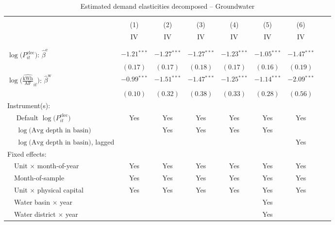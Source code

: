 \begin{table}[t!]\centering
\small
\caption{Estimated demand elasticities decomposed -- Groundwater  \label{tab:water_regs_split}}
\vspace{-0.1cm}
\small
\begin{adjustbox}{center} 
\begin{tabular}{lcccccccc} 
\hline \hline
\vspace{-0.37cm}
\\
 & (1)  & (2)  & (3)  & (4)  & (5)  & (6) \\ 
[0.1em]
 & IV & IV & IV & IV & IV & IV \\
\vspace{-0.37cm}
\\
\cline{2-7}
\vspace{-0.27cm}
\\
 $\log\big(P^{\text{elec}}_{it}\big)$: $\hat\beta^{\text{e}}$ ~ & 
 $-1.21$$^{***}$  & $-1.27$$^{***}$ & $-1.27$$^{***}$ & $-1.23$$^{***}$ & $-1.05$$^{***}$  & $-1.47$$^{***}$ \\ 
& $(0.17)$ & $(0.17)$ & $(0.18)$ & $(0.17)$ & $(0.16)$ & $(0.19)$ \\
[0.75em] 
 $\log\Big(\widehat{\tfrac{{\text{kWh}}}{\text{AF}}}_{it}\Big)$: $\hat\beta^{\text{w}}$ ~ & 
 $-0.99$$^{***}$  & $-1.51$$^{***}$ & $-1.47$$^{***}$ & $-1.25$$^{***}$ & $-1.14$$^{***}$  & $-2.09$$^{***}$ \\ 
[-0.3em] 
& $(0.10)$ & $(0.32)$ & $(0.38)$ & $(0.33)$ & $(0.28)$ & $(0.56)$ \\
[1.5em] 
Instrument(s): \\
[0.1em] 
~~ Default $\log\big(P^{\text{elec}}_{it}\big)$  & Yes & Yes & Yes  & Yes  & Yes & Yes \\
[0.1em] 
~~ $\log\big(\text{Avg depth in basin}\big)$  & & Yes & Yes & Yes & Yes & \\
[0.1em] 
~~ $\log\big(\text{Avg depth in basin}\big)$, lagged  & & & & & & Yes \\
[1.5em] 
Fixed effects: \\
[0.1em] 
~~Unit $\times$ month-of-year  & Yes  & Yes  & Yes  & Yes  & Yes  & Yes   \\ 
[0.1em] 
~~Month-of-sample  & Yes  & Yes  & Yes  & Yes  & Yes  & Yes   \\ 
[0.1em] 
~~Unit $\times$ physical capital & Yes & Yes & Yes & Yes & Yes & Yes  \\
[0.1em] 
~~Water basin $\times$ year & & &  & & Yes &   \\
[0.1em] 
~~Water district $\times$ year & & & & & Yes &  \\

\end{tabular}
\end{adjustbox}
\end{table}

